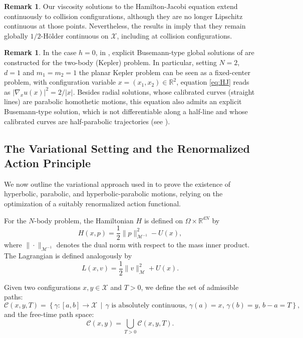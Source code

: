 \documentclass[a4paper,10pt]{amsart}
\theoremstyle{plain}
\theoremstyle{definition}
\newtheorem{rem}[thm]{Remark}
\numberwithin{equation}{section}
\numberwithin{thm}{section}
\begin{document}
\begin{rem}
    Our viscosity solutions to the Hamilton-Jacobi equation extend continuously to collision configurations, although they are no longer Lipschitz continuous at those points. Nevertheless, the results in \cite{Maderna2012, MadernaVenturelli_HyperbolicMotions} imply that they remain globally $1/2$-H\"older continuous on $\mathcal X$, including at collision configurations.
    \end{rem}

    \begin{rem}
        
In the case $h=0$, in \cite{Maderna2012}, explicit Busemann-type global solutions of are constructed for the two-body (Kepler) problem. In particular, setting $N=2$, $d=1$ and $m_1=m_2=1$ the planar Kepler problem can be seen as a fixed-center problem, with configuration variable $x=(x_1,x_2)\in\mathbb R^2$, equation \eqref{eq:HJ} reads as $|\nabla_x u(x)|^2 = 2/|x| $. Besides radial solutions, whose calibrated curves (straight lines) are parabolic homothetic motions, this equation also admits an explicit Busemann-type solution, which is not differentiable along a half-line and whose calibrated curves are half-parabolic trajectories (see \cite[Section 4]{Maderna2012}).
    \end{rem}
\subsection{The Variational Setting and the Renormalized Action Principle}

We now outline the variational approach used in \cite{PolimeniTerracini} to prove the existence of hyperbolic, parabolic, and hyperbolic-parabolic motions, relying on the optimization of a suitably renormalized action functional.

For the $N$-body problem, the Hamiltonian $H$ is defined on $\Omega \times \mathbb{R}^{dN}$ by
\begin{equation}\label{eq:hamiltonian}
    H(x, p) = \frac{1}{2} \|p\|_{\mathcal{M}^{-1}}^2 - U(x),
\end{equation}
where $\|\cdot\|_{\mathcal{M}^{-1}}$ denotes the dual norm with respect to the mass inner product. The Lagrangian is defined analogously by
\begin{equation}\label{eq:lagrangian}
    L(x, v) = \frac{1}{2} \|v\|_\mathcal{M}^2 + U(x).
\end{equation}

Given two configurations $x, y \in \mathcal{X}$ and $T > 0$, we define the set of admissible paths:
\[
\mathcal{C}(x, y, T) = \left\{ \gamma : [a, b] \rightarrow \mathcal{X} \,\middle|\, \gamma \text{ is absolutely continuous},\, \gamma(a) = x,\, \gamma(b) = y,\, b - a = T \right\},
\]
and the free-time path space:
\[
\mathcal{C}(x, y) = \bigcup_{T > 0} \mathcal{C}(x, y, T).
\]
\end{document}
